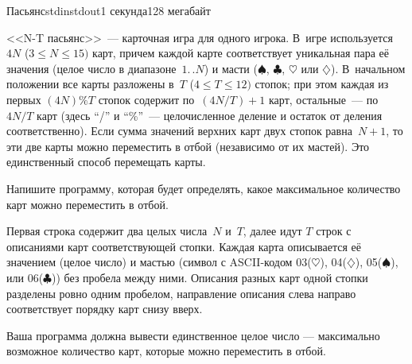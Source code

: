 \begin{problem}{Пасьянс}{stdin}{stdout}{1 секунда}{128 мегабайт}

<<N-T пасьянс>>~--- карточная игра для одного игрока. В~игре используется $4N$ 
($3\leqslant N\leqslant 15)$ карт, причем
каждой карте соответствует уникальная пара её значения (целое число 
в диапазоне~$1.\,.N$) и масти ($\spadesuit$, $\clubsuit$, $\heartsuit$
или $\diamondsuit$). В~начальном положении все карты разложены в~$T$ 
($4\leqslant T\leqslant 12)$ стопок; при этом каждая из первых
$(4N)\%T$ стопок содержит по~$(4N/T)+1$ карт, остальные~--- 
по~$4N/T$ карт (здесь ``/'' и ``\%''~--- целочисленное деление и 
остаток от деления соответственно). Если сумма значений верхних карт
двух стопок равна~$N+1$, то эти две карты можно переместить в отбой 
(независимо от их мастей). Это единственный способ перемещать карты.

Напишите программу, которая будет определять, какое максимальное
количество карт можно переместить в отбой.





\InputFile
Первая строка содержит два целых числа~$N$ и~$T$, далее идут $T$ строк 
с описаниями карт соответствующей стопки. Каждая карта описывается 
её значением (целое число) и мастью (символ с ASCII-кодом 03($\heartsuit$), 
04($\diamondsuit$), 05($\spadesuit$), или 06($\clubsuit$)) без пробела 
между ними. Описания разных карт одной стопки разделены ровно одним пробелом,
направление описания слева направо соответствует
порядку карт снизу вверх.


\OutputFile
Ваша программа должна вывести единственное целое число --- максимально возможное количество карт, которые можно переместить в отбой.

\Examples

\begin{example}
%
\end{example}

\end{problem}
